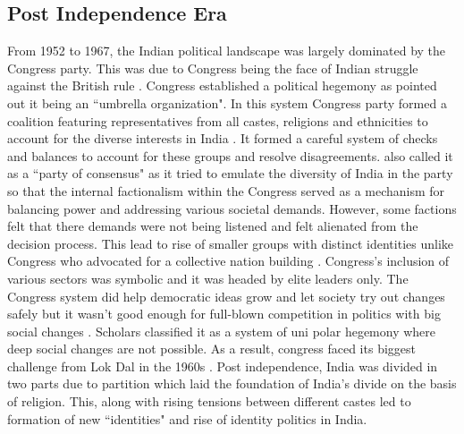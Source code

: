 \subsection{Post Independence Era}
 From 1952 to 1967, the Indian political landscape was largely dominated by the Congress party. This was due to Congress being the face of Indian struggle against the British rule \citep{shastri1991nehru}. Congress established a political hegemony as \cite{kothari1967india} pointed out it being an ``umbrella organization". In this system Congress party formed a  coalition featuring representatives from all castes, religions and ethnicities to account for the diverse interests in India \citep{anand2015downfall}. It formed a careful system of checks and balances to account for these groups and resolve disagreements. \cite{kothari1967india} also called it as a ``party of consensus" as it tried to emulate the diversity of India in the party so that the internal factionalism within the Congress served as a mechanism for balancing power and addressing various societal demands. However, some factions felt that there demands were not being listened and felt alienated from the decision process. This lead to rise of smaller groups with distinct identities unlike Congress who advocated for a collective nation building \citep{shastri2003continuity}.  Congress’s inclusion of various sectors was symbolic and it
was headed by elite leaders only. The Congress system did help democratic ideas grow and let society try out changes safely but it wasn’t good enough for full-blown competition
in politics with big social changes \citep{shastri2009electoral}. Scholars classified it as a system of uni polar hegemony where deep social changes are not possible. As a result, congress faced its biggest challenge from Lok Dal in the 1960s \citep{desouza2006india}. Post independence, India was divided in two parts due to partition which laid the foundation of India's divide on the basis of religion. This, along with rising tensions between different castes led to formation of new ``identities" and rise of identity politics in India. 
